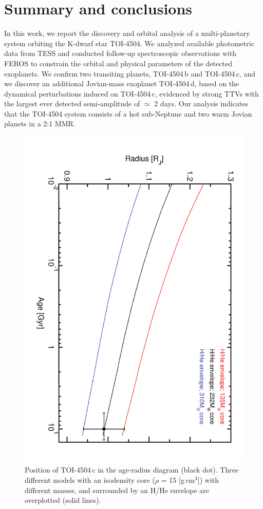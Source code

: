 \documentclass[twocolumn,twocolappendix]{aastex631}
\begin{document}
\section{Summary and conclusions}
\label{sec5}

In this work, we report the discovery and orbital analysis of a multi-planetary system orbiting the K-dwarf star TOI-4504. We analyzed available photometric data from TESS and conducted follow-up spectroscopic observations with FEROS to constrain the orbital and physical parameters of the detected exoplanets. We confirm two transiting planets, TOI-4504\,b and TOI-4504\,c, and we discover an additional Jovian-mass exoplanet TOI-4504\,d, based on the dynamical perturbations induced on TOI-4504\,c, evidenced by strong TTVs with the largest ever detected semi-amplitude of $\simeq$ 2 days.
Our analysis indicates that the TOI-4504 system consists of a hot sub-Neptune and two warm Jovian planets in a 2:1 MMR. %



\begin{figure}
\includegraphics[width=0.72\linewidth,angle=90]{age_rad_TOI4504.pdf}
\caption{Position of TOI-4504\,c in the age-radius diagram (black dot). Three different models with an isodensity core ($\rho$ =  15 [g\,cm$^3$]) with different masses, and surrounded by an H/He envelope are overplotted (solid lines). }
\label{internal_comp} 
\end{figure}
\end{document}
